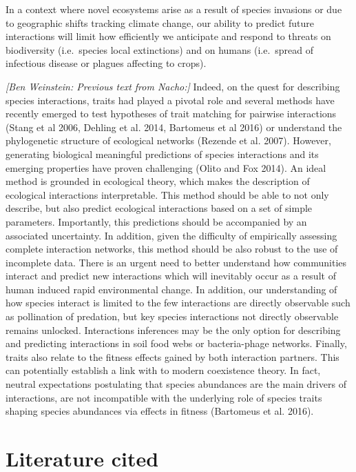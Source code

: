 In a context where novel ecosystems arise as a result of species invasions or
due to geographic shifts tracking climate change, our ability to predict future
interactions will limit how efficiently we anticipate and respond to threats on
biodiversity (i.e.~species local extinctions) and on humans (i.e.~spread of
infectious disease or plagues affecting to crops).

\emph{{[}Ben Weinstein: Previous text from Nacho:{]}} Indeed, on the quest for
describing species interactions, traits had played a pivotal role and several
methods have recently emerged to test hypotheses of trait matching for pairwise
interactions (Stang et al 2006, Dehling et al. 2014, Bartomeus et al 2016) or
understand the phylogenetic structure of ecological networks (Rezende et al.
2007). However, generating biological meaningful predictions of species
interactions and its emerging properties have proven challenging (Olito and Fox
2014). An ideal method is grounded in ecological theory, which makes the
description of ecological interactions interpretable. This method should be able
to not only describe, but also predict ecological interactions based on a set of
simple parameters. Importantly, this predictions should be accompanied by an
associated uncertainty. In addition, given the difficulty of empirically
assessing complete interaction networks, this method should be also robust to
the use of incomplete data. There is an urgent need to better understand how
communities interact and predict new interactions which will inevitably occur as
a result of human induced rapid environmental change. In addition, our
understanding of how species interact is limited to the few interactions are
directly observable such as pollination of predation, but key species
interactions not directly observable remains unlocked. Interactions inferences
may be the only option for describing and predicting interactions in soil food
webs or bacteria-phage networks. Finally, traits also relate to the fitness
effects gained by both interaction partners. This can potentially establish a
link with to modern coexistence theory. In fact, neutral expectations
postulating that species abundances are the main drivers of interactions, are
not incompatible with the underlying role of species traits shaping species
abundances via effects in fitness (Bartomeus et al. 2016).

\section*{Literature cited}\label{literature-cited}


